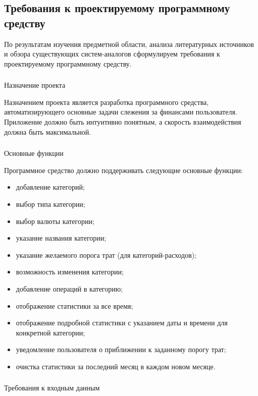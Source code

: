 \subsection{Требования к проектируемому программному средству}
\label{sec:analysis:specification}

По результатам изучения предметной области, анализа литературных источников и обзора существующих систем-аналогов сформулируем требования к проектируемому программному средству.

\subsubsection{} Назначение проекта
\label{sec:analysis:specification:purpose}

Назначением проекта является разработка программного средства, автоматизирующего основные задачи слежения за финансами пользователя. Приложение должно быть интуитивно понятным, а скорость взаимодействия должна быть максимальной.

\subsubsection{} Основные функции
\label{sec:analysis:specification:functions}

Программное средство должно поддерживать следующие основные фун\-к\-ции:

\begin{itemize}
	\item добавление категорий;
	\item выбор типа категории;
	\item выбор валюты категории;
	\item указание названия категории;
	\item указание желаемого порога трат (для категорий-расходов);
	\item возможность изменения категории;
	\item добавление операций в категорию;
	\item отображение статистики за все время;
	\item отображение подробной статистики с указанием даты и времени для конкретной категории;
	\item уведомление пользователя о приближении к заданному порогу трат;
	\item очистка статистики за последний месяц в каждом новом месяце.
\end{itemize}

\subsubsection{} Требования к входным данным
\label{sec:analysis:specification:inputs}

